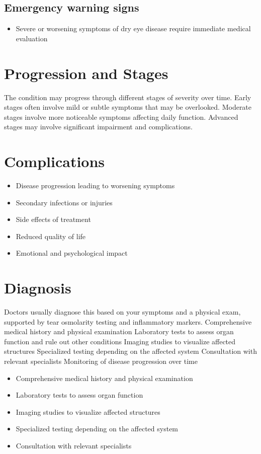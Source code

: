 \subsection{Emergency warning signs}
\begin{itemize}[noitemsep]
  \item Severe or worsening symptoms of dry eye disease require immediate medical evaluation
\end{itemize}
\section{Progression and Stages}
The condition may progress through different stages of severity over time. Early stages often involve mild or subtle symptoms that may be overlooked. Moderate stages involve more noticeable symptoms affecting daily function. Advanced stages may involve significant impairment and complications.
\section{Complications}
\begin{itemize}[noitemsep]
  \item Disease progression leading to worsening symptoms
  \item Secondary infections or injuries
  \item Side effects of treatment
  \item Reduced quality of life
  \item Emotional and psychological impact
\end{itemize}
\section{Diagnosis}
Doctors usually diagnose this based on your symptoms and a physical exam, supported by tear osmolarity testing and inflammatory markers. Comprehensive medical history and physical examination Laboratory tests to assess organ function and rule out other conditions Imaging studies to visualize affected structures Specialized testing depending on the affected system Consultation with relevant specialists Monitoring of disease progression over time

\begin{itemize}[noitemsep]
  \item Comprehensive medical history and physical examination
  \item Laboratory tests to assess organ function
  \item Imaging studies to visualize affected structures
  \item Specialized testing depending on the affected system
  \item Consultation with relevant specialists
\end{itemize}
